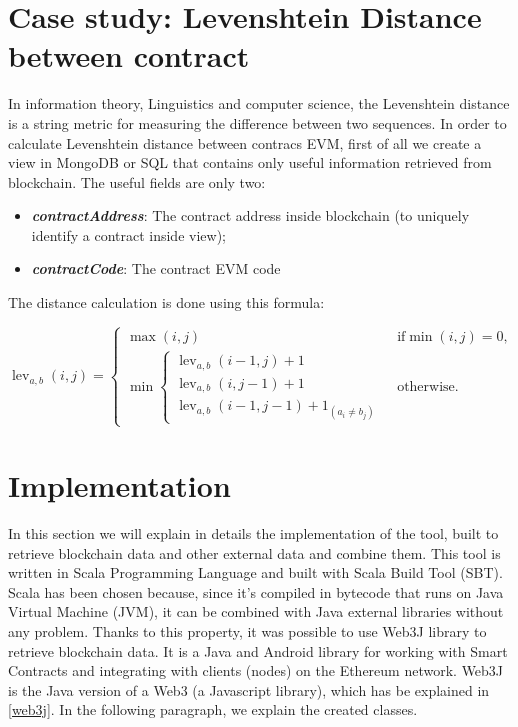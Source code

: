 \section{Case study: Levenshtein Distance between contract}
In information theory, Linguistics and computer science, the Levenshtein distance is a string metric for measuring the difference between two sequences.
In order to calculate Levenshtein distance between contracs EVM, first of all we create a view in MongoDB or SQL that contains only useful information retrieved from blockchain.
The useful fields are only two:
\begin{itemize}
    \item \textit{\textbf{contractAddress}}: The contract address inside blockchain (to uniquely identify a contract inside view);
    \item \textit{\textbf{contractCode}}: The contract EVM code
\end{itemize}
The distance calculation is done using this formula:
\begin{center}
$\operatorname{lev}_{a,b}(i,j) = 
\begin{cases}
  \max(i,j) & \text{ if} \min(i,j)=0, \\
  \min \begin{cases}
      \operatorname{lev}_{a,b}(i-1,j) + 1 \\
      \operatorname{lev}_{a,b}(i,j-1) + 1 \\
      \operatorname{lev}_{a,b}(i-1,j-1) + 1_{(a_i \neq b_j)}
   \end{cases} & \text{ otherwise.}
\end{cases}
$
\end{center}


\section{Implementation}
In this section we will explain in details the implementation of the tool, built to retrieve blockchain data and other external data and combine them. \newline
This tool is written in Scala Programming Language and built with Scala Build Tool (SBT). \newline
Scala has been chosen because, since it's compiled in bytecode that runs on Java Virtual Machine (JVM), it can be combined with Java external libraries without any problem. \newline
Thanks to this property, it was possible to use Web3J library to retrieve blockchain data. It is a Java and Android library for working with Smart Contracts and integrating with clients (nodes) on the Ethereum network. \newline
Web3J is the Java version of a Web3 (a Javascript library), which has be explained in \ref{web3j}. In the following paragraph, we explain the created classes.